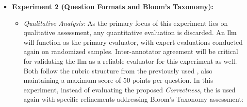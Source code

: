 \begin{itemize}

    \item \textbf{Experiment 2 (Question Formats and Bloom's Taxonomy):}
    \begin{itemize}
        \item \textit{Qualitative Analysis:} As the primary focus of this experiment lies on qualitative assessment, any quantitative evaluation is discarded. An \ac{llm} will function as the primary evaluator, with expert evaluations conducted again on randomized samples. Inter-annotator agreement will be critical for validating the \ac{llm} as a reliable evaluator for this experiment as well. Both follow the rubric structure from the previously used \cite{mi_comparative_2024}, also maintaining a maximum score of 50 points per question. In this experiment, instead of evaluating the proposed \textit{Correctness}, the  is used again with specific refinements addressing Bloom's Taxonomy assessment:
        \vspace{5em}
        \pagebreak


\end{itemize}
\end{itemize}
